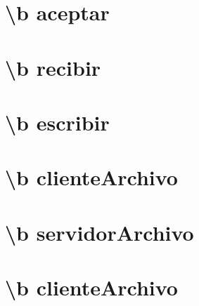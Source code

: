 \documentclass[twoside]{book}
\begin{document}
\chapter{\textbackslash{}b aceptar}
\label{abrirConnect}
\hypertarget{abrirConnect}{}

\chapter{\textbackslash{}b recibir}
\label{recibir}
\hypertarget{recibir}{}

\chapter{\textbackslash{}b escribir}
\label{escribir}
\hypertarget{escribir}{}

\chapter{\textbackslash{}b cliente\-Archivo}
\label{clienteArchivo}
\hypertarget{clienteArchivo}{}

\chapter{\textbackslash{}b servidor\-Archivo}
\label{servidorArchivo}
\hypertarget{servidorArchivo}{}

\chapter{\textbackslash{}b cliente\-Archivo}
\label{getTamanoFichero}
\hypertarget{getTamanoFichero}{}


\newpage
{}
{}
\printindex
\end{document}
